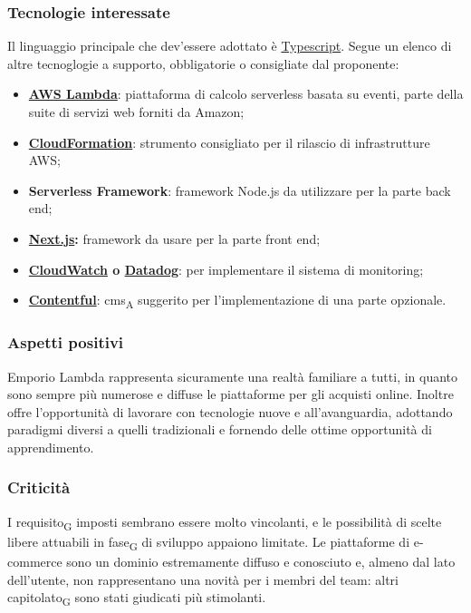 \subsubsection{Tecnologie interessate}

Il linguaggio principale che dev'essere adottato è \href{https://www.typescriptlang.org/}{Typescript}. Segue un elenco di altre tecnoglogie a supporto, obbligatorie o consigliate dal proponente:
\begin{itemize}
    \item \textbf{\href{https://aws.amazon.com/it/lambda/}{AWS Lambda}}: piattaforma di calcolo serverless basata su eventi, parte della suite di servizi web forniti da Amazon;
    \item \textbf{\href{https://aws.amazon.com/it/cloudformation/}{CloudFormation}}: strumento consigliato per il rilascio di infrastrutture AWS;
    \item \textbf{Serverless Framework}: framework Node.js da utilizzare per la parte back end;
    \item \textbf{\href{https://nextjs.org/}{Next.js}:} framework da usare per la parte front end;
    \item \textbf{\href{https://aws.amazon.com/it/cloudwatch/}{CloudWatch} o \href{https://www.datadoghq.com/}{Datadog}}: per implementare il sistema di monitoring;
    \item \textbf{\href{https://www.contentful.com/}{Contentful}}: cms\textsubscript{A} suggerito per l'implementazione di una parte opzionale.
\end{itemize}


\subsubsection{Aspetti positivi}

Emporio Lambda rappresenta sicuramente una realtà familiare a tutti, in quanto sono sempre più numerose e diffuse le piattaforme per gli acquisti online. Inoltre offre l'opportunità di lavorare con tecnologie nuove e all'avanguardia, adottando paradigmi diversi a quelli tradizionali e fornendo delle ottime opportunità di apprendimento.


\subsubsection{Criticità}

I requisito\textsubscript{G} imposti sembrano essere molto vincolanti, e le possibilità di scelte libere attuabili in fase\textsubscript{G} di sviluppo appaiono limitate. Le piattaforme di e-commerce sono un dominio estremamente diffuso e conosciuto e, almeno dal lato dell'utente, non rappresentano una novità per i membri del team: altri capitolato\textsubscript{G} sono stati giudicati più stimolanti.


